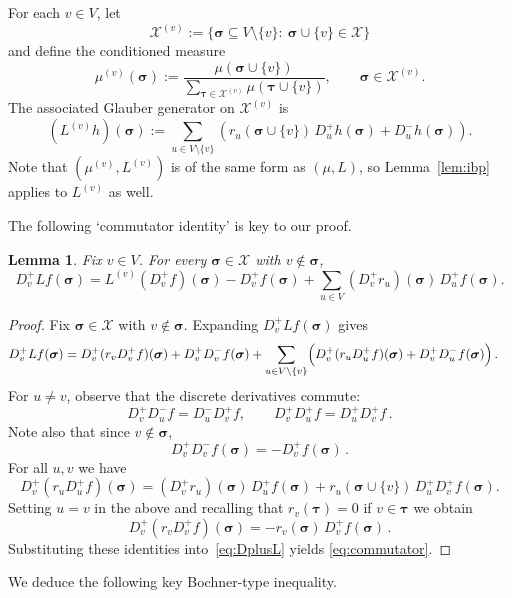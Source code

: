\documentclass[10pt]{amsart}
\newtheorem{lemma}[theorem]{Lemma}
\newcommand{\sigmabf}{ \boldsymbol{\sigma} }
\newcommand{\taubf}{ \boldsymbol{\tau} }
\begin{document}
	
	
	For each $v\in V$, let
	\[
	\mathcal X^{(v)}:=\{\sigmabf\subseteq V\setminus\{v\}:\ \sigmabf\cup\{v\}\in \mathcal X\}
	\]
	and define the conditioned measure
	\[
	\mu^{(v)}(\sigmabf)
	:=
	\frac{\mu(\sigmabf\cup\{v\})}
	{\sum_{\taubf\in\mathcal X^{(v)}}\mu(\taubf\cup\{v\})},
	\qquad \sigmabf\in \mathcal X^{(v)}.
	\]
	The associated Glauber generator on $\mathcal X^{(v)}$ is
	\[
	(L^{(v)}h)(\sigmabf)
	:=
	\sum_{u\in V\setminus\{v\}}
	\left(
	r_u(\sigmabf\cup\{v\})\,D_u^+h(\sigmabf)+D_u^-h(\sigmabf)
	\right).
	\]
	Note that $(\mu^{(v)},L^{(v)})$ is of the same form as $(\mu,L)$, so Lemma~\ref{lem:ibp}
	applies to $L^{(v)}$ as well.
	
	The following `commutator identity' is key to our proof.
	
	\begin{lemma}\label{lem:commutator}
		Fix $v\in V$. For every $\sigmabf\in\mathcal X$ with $v\notin \sigmabf$,
		\begin{equation}\label{eq:commutator}
			D_v^+Lf(\sigmabf)
			=
			L^{(v)}(D_v^+f)(\sigmabf)
			-
			D_v^+f(\sigmabf)
			+
			\sum_{u\in V}(D_v^+r_u)(\sigmabf)\,D_u^+f(\sigmabf).
		\end{equation}
	\end{lemma}
	
	\begin{proof}
		Fix $\sigmabf\in\mathcal X$ with $v\notin \sigmabf$. Expanding $D_v^+L f(\sigmabf)$ gives
		\begin{align}\label{eq:DplusL}
			D_v^+Lf(\sigmabf)
			&=
			D_v^+(r_vD_v^+f)(\sigmabf)+D_v^+D_v^-f(\sigmabf)+
			\sum_{\substack{u\in V\backslash\{v\}}}
			\Bigl(
			D_v^+(r_uD_u^+f)(\sigmabf)+D_v^+D_u^-f(\sigmabf)
			\Bigr)\, .
		\end{align}
		For $u\neq v$, observe that the discrete derivatives commute:
		\[
		D_v^+D_u^-f=D_u^-D_v^+f,
		\qquad
		D_v^+D_u^+f=D_u^+D_v^+f\, .
		\]
		Note also that since $v\notin \sigmabf$,
		\[
		D_v^+D_v^-f(\sigmabf)=-D_v^+f(\sigmabf)\, .
		\]
		For all $u,v$ we have
		\[
		D_v^+(r_uD_u^+f)(\sigmabf)
		=
		(D_v^+r_u)(\sigmabf)\,D_u^+f(\sigmabf)
		+
		r_u(\sigmabf\cup\{v\})\,D_u^+D_v^+f(\sigmabf).
		\]
		Setting $u=v$ in the above and recalling that $r_v(\taubf)=0$ if $v\in \taubf$ we obtain 
		\[
		D_v^+(r_vD_v^+f)(\sigmabf)=-r_v(\sigmabf)\,D_v^+f(\sigmabf)\, .
		\]
		Substituting these identities into~\eqref{eq:DplusL} yields \eqref{eq:commutator}.
	\end{proof}
	
	We deduce the following key Bochner-type inequality. 
	
\end{document}
